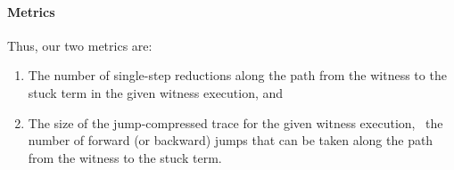 \paragraph{Metrics} Thus, our two metrics are:
%
\begin{enumerate}
\item {}
      The number of single-step reductions along the path from the
      witness to the stuck term in the given witness execution, and
\item {}
      The size of the jump-compressed trace for the given witness execution,
      \ie\ the number of forward (or backward) jumps that can be taken along the
      path from the witness to the stuck term.
\end{enumerate}


